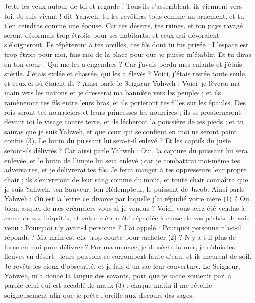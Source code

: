 \begin{multicols}{2}
{Jette les yeux autour de toi et regarde : Tous ils s’assemblent, ils viennent vers toi. Je suis vivant ! dit Yahweh, tu les revêtiras tous comme un ornement, et tu t'en ceindras comme une épouse.
Car tes déserts, tes ruines, et ton pays ravagé seront désormais trop étroits pour ses habitants, et ceux qui dévoraient s'éloigneront.
Ils répèteront à tes oreilles, ces fils dont tu fus privée : L’espace est trop étroit pour moi, fais-moi de la place pour que je puisse m’établir.
Et tu diras en ton cœur : Qui me les a engendrés ? Car j'avais perdu mes enfants et j'étais stérile. J’étais exilée et chassée, qui les a élevés ? Voici, j'étais restée toute seule, et ceux-ci où étaient-ils ?
Ainsi parle le Seigneur Yahweh : Voici, je lèverai ma main vers les nations et je dresserai ma bannière vers les peuples ; et ils ramèneront tes fils entre leurs bras, et ils porteront tes filles sur les épaules.
Des rois seront tes nourriciers et leurs princesses tes nourrices ; ils se prosterneront devant toi le visage contre terre, et ils lécheront la poussière de tes pieds ; et tu sauras que je suis Yahweh, et que ceux qui se confient en moi ne seront point confus (3).
Le butin du puissant lui sera-t-il enlevé ? Et les captifs du juste seront-ils délivrés ?
Car ainsi parle Yahweh : Oui, la capture du puissant lui sera enlevée, et le butin de l’impie lui sera enlevé ; car je combattrai moi-même tes adversaires, et je délivrerai tes fils.
Je ferai manger à tes oppresseurs leur propre chair ; ils s'enivreront de leur sang comme du moût, et toute chair connaîtra que je suis Yahweh, ton Sauveur, ton Rédempteur, le puissant de Jacob.
\VerseOne{}Ainsi parle Yahweh : Où est la lettre de divorce par laquelle j’ai répudié votre mère (1) ? Ou bien, auquel de mes créanciers vous ai-je vendus ? Voici, vous avez été vendus à cause de vos iniquités, et votre mère a été répudiée à cause de vos péchés.
Je suis venu : Pourquoi n’y avait-il personne ? J’ai appelé : Pourquoi personne n’a-t-il répondu ? Ma main est-elle trop courte pour racheter (2) ? N'y a-t-il plus de force en moi pour délivrer ? Par ma menace, je dessèche la mer, je réduis les fleuves en désert ; leurs poissons se corrompent faute d’eau, et ils meurent de soif.
Je revêts les cieux d’obscurité, et je fais d’un sac leur couverture.
Le Seigneur, Yahweh, m'a donné la langue des savants, pour que je sache soutenir par la parole celui qui est accablé de maux (3) ; chaque matin il me réveille soigneusement afin que je prête l'oreille aux discours des sages.
}
\end{multicols}
